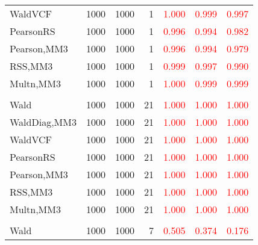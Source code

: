 \documentclass[
]{article}
\begin{document}
\begin{table}[H]
{\begin{tabular}[t]{lrrrrrr}
\hspace{1em}WaldVCF & 1000 & 1000 & 1 & \textcolor{red}{1.000} & \textcolor{red}{0.999} & \textcolor{red}{0.997}\\
\hspace{1em}PearsonRS & 1000 & 1000 & 1 & \textcolor{red}{0.996} & \textcolor{red}{0.994} & \textcolor{red}{0.982}\\
\hspace{1em}Pearson,MM3 & 1000 & 1000 & 1 & \textcolor{red}{0.996} & \textcolor{red}{0.994} & \textcolor{red}{0.979}\\
\hspace{1em}RSS,MM3 & 1000 & 1000 & 1 & \textcolor{red}{0.999} & \textcolor{red}{0.997} & \textcolor{red}{0.990}\\
\hspace{1em}Multn,MM3 & 1000 & 1000 & 1 & \textcolor{red}{1.000} & \textcolor{red}{0.999} & \textcolor{red}{0.999}\\
\addlinespace[0.3em]
\multicolumn{7}{l}{\textbf{1F 15V}}\\
\hspace{1em}Wald & 1000 & 1000 & 21 & \textcolor{red}{1.000} & \textcolor{red}{1.000} & \textcolor{red}{1.000}\\
\hspace{1em}WaldDiag,MM3 & 1000 & 1000 & 21 & \textcolor{red}{1.000} & \textcolor{red}{1.000} & \textcolor{red}{1.000}\\
\hspace{1em}WaldVCF & 1000 & 1000 & 21 & \textcolor{red}{1.000} & \textcolor{red}{1.000} & \textcolor{red}{1.000}\\
\hspace{1em}PearsonRS & 1000 & 1000 & 21 & \textcolor{red}{1.000} & \textcolor{red}{1.000} & \textcolor{red}{1.000}\\
\hspace{1em}Pearson,MM3 & 1000 & 1000 & 21 & \textcolor{red}{1.000} & \textcolor{red}{1.000} & \textcolor{red}{1.000}\\
\hspace{1em}RSS,MM3 & 1000 & 1000 & 21 & \textcolor{red}{1.000} & \textcolor{red}{1.000} & \textcolor{red}{1.000}\\
\hspace{1em}Multn,MM3 & 1000 & 1000 & 21 & \textcolor{red}{1.000} & \textcolor{red}{1.000} & \textcolor{red}{1.000}\\
\addlinespace[0.3em]
\multicolumn{7}{l}{\textbf{2F 10V}}\\
\hspace{1em}Wald & 1000 & 1000 & 7 & \textcolor{red}{0.505} & \textcolor{red}{0.374} & \textcolor{red}{0.176}\\

\end{tabular}}
\end{table}
\end{document}
